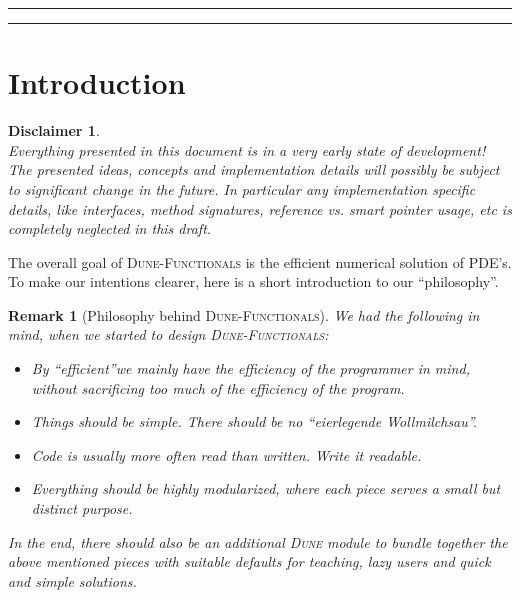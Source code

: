 \documentclass[a4paper,11pt]{article}
\title{\dunefunctionals}
\author{Felix Albrecht (\Code{felix.albrecht@uni-muenster.de})}
\date{\today}
\numberwithin{equation}{section}
\newtheorem{remark}[definition]{Remark}
\newtheorem{disclaimer}[definition]{Disclaimer}
\newcommand{\theoremNewline}{\hspace{1mm}\\}
\newcommand{\theoremEndLine}{\hspace{1mm}}
\newcommand{\dune}{\textsc{Dune}\xspace}
\newcommand{\dunefem}{\textsc{Dune-Fem}\xspace}
\newcommand{\dunefunctionals}{\textsc{Dune-Functionals}\xspace}
\newcommand{\dunepdelab}{\textsc{Dune-PDELab}\xspace}
\begin{document}
\maketitle

\begin{abstract}
	This document is a draft about a new \dune discretization module, based on \dunefem and \dunepdelab.
\end{abstract}

\hrule

\begin{small}
	\tableofcontents
\end{small}

\vspace{5mm}
\hrule


\section{Introduction}
	\label{section::introduction}


\begin{disclaimer}\theoremNewline
	\label{disclaimer::introduction}
	Everything presented in this document is in a very early state of development! The presented ideas, concepts and
	implementation details will possibly be subject to significant change in the future. In particular any implementation
	specific details, like interfaces, method signatures, reference vs. smart pointer usage, etc is completely neglected in
	this draft.
\end{disclaimer}\theoremEndLine

The overall goal of \dunefunctionals is the efficient numerical solution of PDE's. To make our intentions clearer,
here is a short introduction to our ``philosophy''.

\begin{remark}[Philosophy behind \dunefunctionals]
We had the following in mind, when we started to design \dunefunctionals:
  \begin{itemize}
    \item By \textquotedblleft efficient\textquotedblright we mainly have the efficiency of the programmer in mind, without sacrificing too much of the efficiency of the program.
    \item Things should be simple. There should be no \textquotedblleft eierlegende Wollmilchsau\textquotedblright.
    \item Code is usually more often read than written. Write it readable.
    \item Everything should be highly modularized, where each piece serves a small but distinct purpose.
  \end{itemize}
  In the end, there should also be an additional \dune module to bundle together the above mentioned pieces with
  suitable defaults for teaching, lazy users and quick and simple solutions.
\end{remark}
\end{document}
